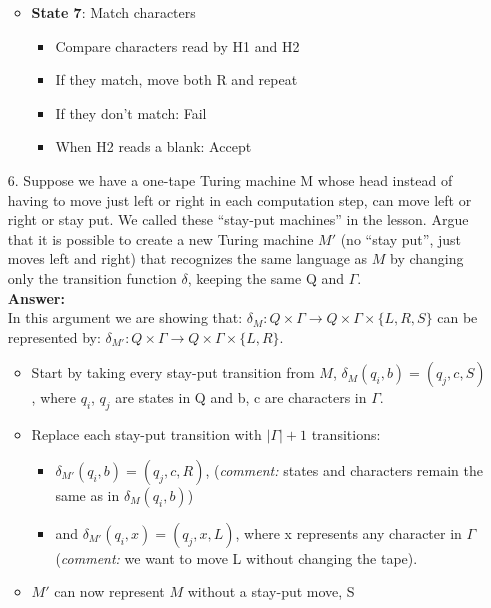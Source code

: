 \documentclass[12pt]{article}
\begin{document}
\begin{itemize}
\begin{itemize}
\begin{itemize}
	\end{itemize}\vspace{.2in}
	\item \textbf{State 7}: Match characters
	\begin{itemize}
	\item Compare characters read by H1 and H2
	\item If they match, move both R and repeat
	\item If they don't match: Fail
	\item When H2 reads a blank: Accept
	\end{itemize}
	\end{itemize}
	\vspace{.2in}
	\newpage
\item[{\rm 6.}] Suppose we have a one-tape Turing machine M whose head instead of having to move just left or right in each computation step, can move left or right or stay put.  We called these ``stay-put machines'' in the lesson.  Argue that it is possible to create a new Turing machine $M'$ (no ``stay put'', just moves left and right) that recognizes the same language as $M$ by changing only the transition function $\delta$, keeping the same Q and $\Gamma$.
	\\[.2in]\textbf{Answer:}
	\\[.2in] In this argument we are showing that: $\delta_{M}: Q \times \Gamma \rightarrow Q \times \Gamma \times \{L,R,S\}$ can be represented by: $\delta_{M'}: Q \times \Gamma \rightarrow Q \times \Gamma \times \{L,R\}$.
	\begin{itemize}
	\item Start by taking every stay-put transition from $M$,  $\delta_{M}(q_{i},b) = (q_{j},c,S)$, where $q_{i}$, $q_{j}$ are states in Q and b, c are characters in $\Gamma$.
	\item Replace each stay-put transition with $|\Gamma| + 1$ transitions:
	\begin{itemize}
	  \item $\delta_{M'}(q_{i},b) = (q_{j},c,R)$, (\textit{comment:} states and characters remain the same as in $\delta_{M}(q_{i},b)$)
	  \item and $\delta_{M'}(q_{i},x) = (q_{j},x,L)$, where x represents any character in $\Gamma$ (\textit{comment:} we want to move L without changing the tape).
	\end{itemize}
	\item $M'$ can now represent $M$ without a stay-put move, S
	\end{itemize}
	\vspace{.2in}


\end{itemize}
\end{document}
